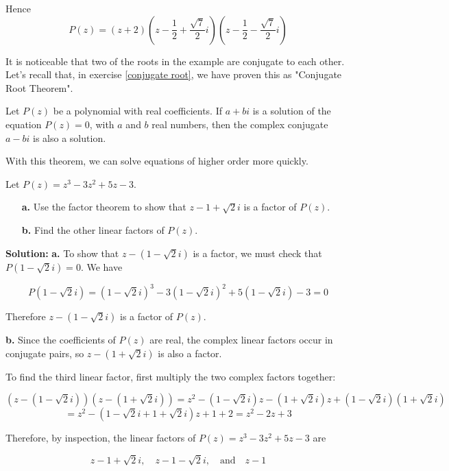Hence
\[
P(z) = (z + 2)\left(z - \frac{1}{2} + \frac{\sqrt{7}}{2}i\right)\left(z - \frac{1}{2} - \frac{\sqrt{7}}{2}i\right)
\]

It is noticeable that two of the roots in the example are conjugate to each other. Let's recall that, in
exercise \ref{conjugate root}, we have proven this as "Conjugate Root Theorem".
\begin{theorem}
    Let \( P(z) \) be a polynomial with real coefficients. If \( a + bi \) is a solution of the equation \( P(z) = 0 \), with \( a \) and \( b \) real numbers, then the complex conjugate \( a - bi \) is also a solution.
\end{theorem}

With this theorem, we can solve equations of higher order more quickly.

\begin{example}
    Let \( P(z) = z^3 - 3z^2 + 5z - 3 \).

\begin{enumerate}
    \item[\textbf{a.}] Use the factor theorem to show that \( z - 1 + \sqrt{2}i \) is a factor of \( P(z) \).
    \item[\textbf{b.}] Find the other linear factors of \( P(z) \).
\end{enumerate}
\end{example}
\textbf{Solution:}
\textbf{a.} To show that \( z - (1 - \sqrt{2}i) \) is a factor, we must check that \( P(1 - \sqrt{2}i) = 0 \).
We have

\[ 
P(1 - \sqrt{2}i) = (1 - \sqrt{2}i)^3 - 3(1 - \sqrt{2}i)^2 + 5(1 - \sqrt{2}i) - 3 = 0 
\]

Therefore \( z - (1 - \sqrt{2}i) \) is a factor of \( P(z) \).

\textbf{b.} Since the coefficients of \( P(z) \) are real, the complex linear factors occur in conjugate pairs, so \( z - (1 + \sqrt{2}i) \) is also a factor.

To find the third linear factor, first multiply the two complex factors together:

\[
(z - (1 - \sqrt{2}i))(z - (1 + \sqrt{2}i)) = z^2 - (1 - \sqrt{2}i)z - (1 + \sqrt{2}i)z + (1 - \sqrt{2}i)(1 + \sqrt{2}i)
\]
\[
= z^2 - (1 - \sqrt{2}i + 1 + \sqrt{2}i)z + 1 + 2 = z^2 - 2z + 3
\]

Therefore, by inspection, the linear factors of \( P(z) = z^3 - 3z^2 + 5z - 3 \) are

\[ z - 1 + \sqrt{2}i, \quad z - 1 - \sqrt{2}i, \quad \text{and} \quad z - 1 \]

